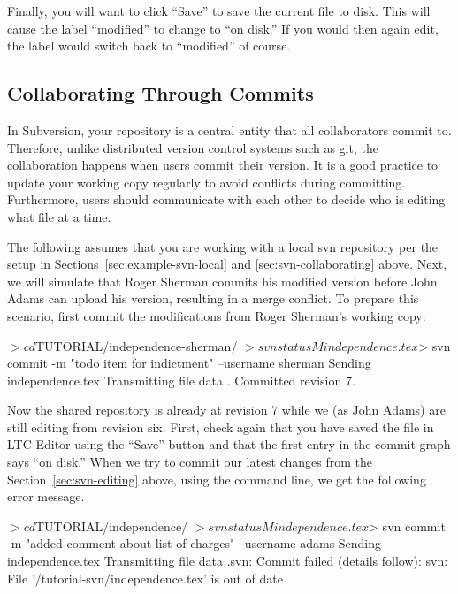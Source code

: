 Finally, you will want to click ``Save'' to save the current file to disk.  This will cause the label ``modified'' to change to ``on disk.''  If you would then again edit, the label would switch back to ``modified'' of course.

\subsection{Collaborating Through Commits}

In Subversion, your repository is a central entity that all collaborators commit to.  Therefore, unlike distributed version control systems such as git, the collaboration happens when users commit their version.  It is a good practice to update your working copy regularly to avoid conflicts during committing.  Furthermore, users should communicate with each other to decide who is editing what file at a time.

The following assumes that you are working with a local svn repository per the setup in Sections~\ref{sec:example-svn-local} and \ref{sec:svn-collaborating} above.  Next, we will simulate that Roger Sherman commits his modified version before John Adams can upload his version, resulting in a merge conflict.  To prepare this scenario, first commit the modifications from Roger Sherman's working copy:
\begin{CodeVerbatim}[commandchars=\\\{\}]
$> cd $TUTORIAL/independence-sherman/
$> svn status
M       independence.tex
$> svn commit -m "todo item for indictment" --username sherman 
Sending        independence.tex
Transmitting file data .
Committed revision 7.
\end{CodeVerbatim}

Now the shared repository is already at revision 7 while we (as John Adams) are still editing from revision six.  First, check again that you have saved the file in LTC Editor using the ``Save'' button and that the first entry in the commit graph says ``on disk.'' When we try to commit our latest changes from the Section~\ref{sec:svn-editing} above, using the command line, we get the following error message.  
\begin{CodeVerbatim}[commandchars=\\\{\}]
$> cd $TUTORIAL/independence/
$> svn status
M       independence.tex
$> svn commit -m "added comment about list of charges" --username adams
Sending        independence.tex
Transmitting file data .svn: Commit failed (details follow):
svn: File '/tutorial-svn/independence.tex' is out of date
\end{CodeVerbatim}

